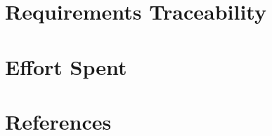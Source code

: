 \documentclass[english]{article}
\begin{document}
\section{Requirements Traceability} %
\section{Effort Spent} %
\section{References}
\end{document}

